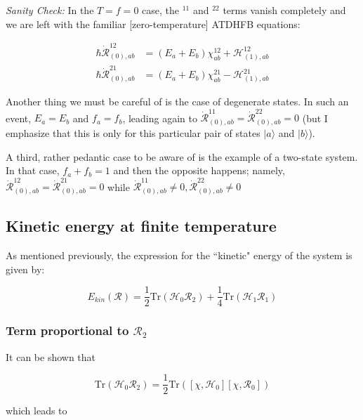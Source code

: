\noindent\textit{Sanity Check:} In the $T=f=0$ case, the $^{11}$ and $^{22}$ terms vanish completely and we are left with the familiar [zero-temperature] ATDHFB equations:

\begin{align}
\hbar \dot{\mathcal{R}}_{(0),ab}^{12} &= (E_a+E_b)\chi_{ab}^{12} + \mathcal{H}^{12}_{(1),ab} \\
\hbar \dot{\mathcal{R}}_{(0),ab}^{21} &= (E_a+E_b)\chi_{ab}^{21} - \mathcal{H}^{21}_{(1),ab}
\end{align}

Another thing we must be careful of is the case of degenerate states. In such an event, $E_a=E_b$ and $f_a=f_b$, leading again to $\mathcal{\dot{R}}^{11}_{(0),ab}=\mathcal{\dot{R}}^{22}_{(0),ab}=0$ (but I emphasize that this is only for this particular pair of states $|a\rangle$ and $|b\rangle$).

A third, rather pedantic case to be aware of is the example of a two-state system. In that case, $f_a+f_b=1$ and then the opposite happens; namely, $\mathcal{\dot{R}}^{12}_{(0),ab}=\mathcal{\dot{R}}^{21}_{(0),ab}=0$ while $\mathcal{\dot{R}}^{11}_{(0),ab}\neq0, \mathcal{\dot{R}}^{22}_{(0),ab}\neq0$

\subsection{Kinetic energy at finite temperature}

As mentioned previously, the expression for the ``kinetic" energy of the system is given by:

\begin{equation}
E_{kin}(\mathcal{R}) = \frac{1}{2}\mathrm{Tr}\left(\mathcal{H}_0\mathcal{R}_2\right) + \frac{1}{4}\mathrm{Tr}\left(\mathcal{H}_1\mathcal{R}_1\right)
\end{equation}

\subsubsection{Term proportional to $\mathcal{R}_2$}

It can be shown that

\begin{equation}
\mathrm{Tr}\left(\mathcal{H}_0\mathcal{R}_2\right) = \frac{1}{2}\mathrm{Tr}\left(\left[\chi,\mathcal{H}_0\right]\left[\chi,\mathcal{R}_0\right]\right)
\end{equation}

\noindent which leads to

